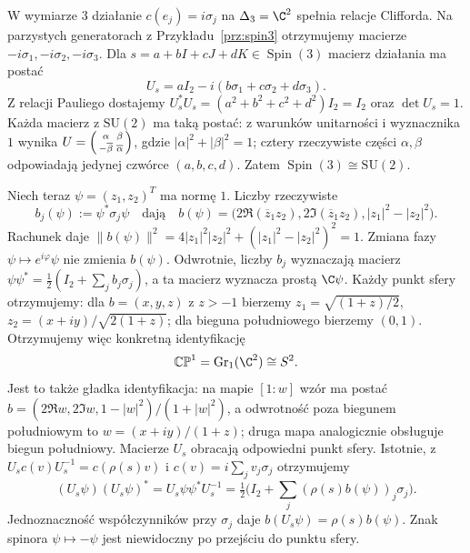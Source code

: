 \begin{przyklad}
\label{prz:bloch}
W wymiarze $3$ działanie
$c(e_j)=i\sigma_j$ na $\Delta_3=\C^2$
spełnia relacje Clifforda. Na parzystych
generatorach z Przykładu~\ref{prz:spin3}
otrzymujemy macierze $-i\sigma_1,-i\sigma_2,
-i\sigma_3$. Dla
$s=a+bI+cJ+dK\in\operatorname{Spin}(3)$
macierz działania ma postać
\[
 U_s=aI_2-i(b\sigma_1+c\sigma_2+d\sigma_3).
\]
Z relacji Pauliego dostajemy
$U_s^*U_s=(a^2+b^2+c^2+d^2)I_2=I_2$
oraz $\det U_s=1$. Każda macierz z
$\mathrm{SU}(2)$ ma taką postać: z warunków
unitarności i wyznacznika $1$ wynika
$U=\begin{psmallmatrix}\alpha&\beta\\
-\overline\beta&\overline\alpha\end{psmallmatrix}$,
gdzie $|\alpha|^2+|\beta|^2=1$; cztery
rzeczywiste części $\alpha,\beta$ odpowiadają
jedynej czwórce $(a,b,c,d)$.
Zatem $\operatorname{Spin}(3)\cong\mathrm{SU}(2)$.

Niech teraz $\psi=(z_1,z_2)^T$ ma normę $1$.
Liczby rzeczywiste
\begin{equation}\label{eq:spin-bloch}
 b_j(\psi):=\psi^*\sigma_j\psi
 \quad\text{dają}\quad
 b(\psi)=
 \bigl(2\Re(\overline z_1z_2),
       2\Im(\overline z_1z_2),
       |z_1|^2-|z_2|^2\bigr).
\end{equation}
Rachunek daje
$\|b(\psi)\|^2=
4|z_1|^2|z_2|^2+(|z_1|^2-|z_2|^2)^2=1$.
Zmiana fazy $\psi\mapsto e^{i\varphi}\psi$
nie zmienia $b(\psi)$. Odwrotnie, liczby
$b_j$ wyznaczają macierz
$\psi\psi^*=\frac12(I_2+\sum_jb_j\sigma_j)$,
a ta macierz wyznacza prostą $\C\psi$.
Każdy punkt sfery otrzymujemy: dla
$b=(x,y,z)$ z $z>-1$ bierzemy
$z_1=\sqrt{(1+z)/2}$,
$z_2=(x+iy)/\sqrt{2(1+z)}$;
dla bieguna południowego bierzemy $(0,1)$.
Otrzymujemy więc konkretną identyfikację
\[
 \mathbb{CP}^1=\operatorname{Gr}_1(\C^2)\cong S^2.
\]
Jest to także gładka identyfikacja: na mapie $[1:w]$
wzór ma postać
$b=(2\Re w,2\Im w,1-|w|^2)/(1+|w|^2)$,
a odwrotność poza biegunem południowym to $w=(x+iy)/(1+z)$;
druga mapa analogicznie obsługuje biegun południowy.
Macierze $U_s$ obracają odpowiedni punkt sfery.
Istotnie, z $U_sc(v)U_s^{-1}=c(\rho(s)v)$ i $c(v)=i\sum_jv_j\sigma_j$
otrzymujemy
\[
 (U_s\psi)(U_s\psi)^*
 =U_s\psi\psi^*U_s^{-1}
 =\tfrac12\bigl(I_2+\textstyle\sum_j(\rho(s)b(\psi))_j\sigma_j\bigr).
\]
Jednoznaczność współczynników przy $\sigma_j$ daje
$b(U_s\psi)=\rho(s)b(\psi)$.
Znak spinora $\psi\mapsto-\psi$ jest
niewidoczny po przejściu do punktu sfery.
\end{przyklad}

